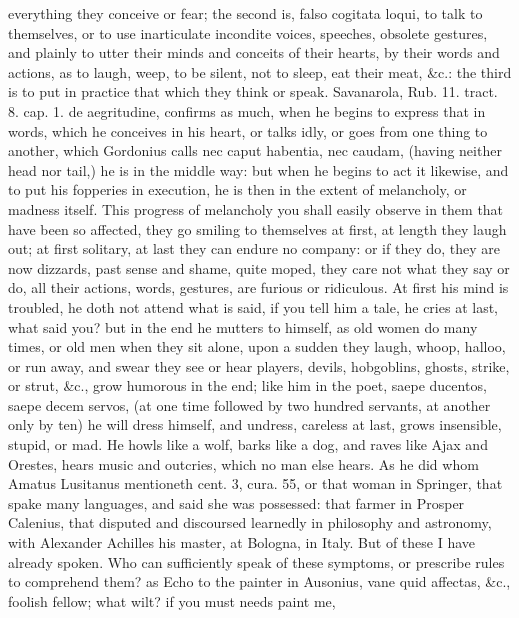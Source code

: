 {everything they conceive or fear; the second is, falso cogitata loqui,
to talk to themselves, or to use inarticulate incondite voices,
speeches, obsolete gestures, and plainly to utter their minds and
conceits of their hearts, by their words and actions, as to laugh,
weep, to be silent, not to sleep, eat their meat, \&c.: the third is to
put in practice that which they think or speak. Savanarola, Rub.
11. tract. 8. cap. 1. de aegritudine, confirms as much, when he
begins to express that in words, which he conceives in his heart, or
talks idly, or goes from one thing to another, which Gordonius
calls nec caput habentia, nec caudam, (having neither head nor tail,)
he is in the middle way:  but when he begins to act it likewise,
and to put his fopperies in execution, he is then in the extent of
melancholy, or madness itself. This progress of melancholy you shall
easily observe in them that have been so affected, they go smiling to
themselves at first, at length they laugh out; at first solitary, at
last they can endure no company: or if they do, they are now dizzards,
past sense and shame, quite moped, they care not what they say or do,
all their actions, words, gestures, are furious or ridiculous. At first
his mind is troubled, he doth not attend what is said, if you tell him
a tale, he cries at last, what said you? but in the end he mutters to
himself, as old women do many times, or old men when they sit alone,
upon a sudden they laugh, whoop, halloo, or run away, and swear they
see or hear players, devils, hobgoblins, ghosts, strike, or
strut, \&c., grow humorous in the end; like him in the poet, saepe
ducentos, saepe decem servos, (at one time followed by two hundred
servants, at another only by ten) he will dress himself, and undress,
careless at last, grows insensible, stupid, or mad. He howls like
a wolf, barks like a dog, and raves like Ajax and Orestes, hears music
and outcries, which no man else hears. As he did whom Amatus
Lusitanus mentioneth cent. 3, cura. 55, or that woman in
Springer, that spake many languages, and said she was possessed:
that farmer in Prosper Calenius, that disputed and discoursed
learnedly in philosophy and astronomy, with Alexander Achilles his
master, at Bologna, in Italy. But of these I have already spoken.
Who can sufficiently speak of these symptoms, or prescribe rules to
comprehend them? as Echo to the painter in Ausonius, vane quid
affectas, \&c., foolish fellow; what wilt? if you must needs paint me,
}
